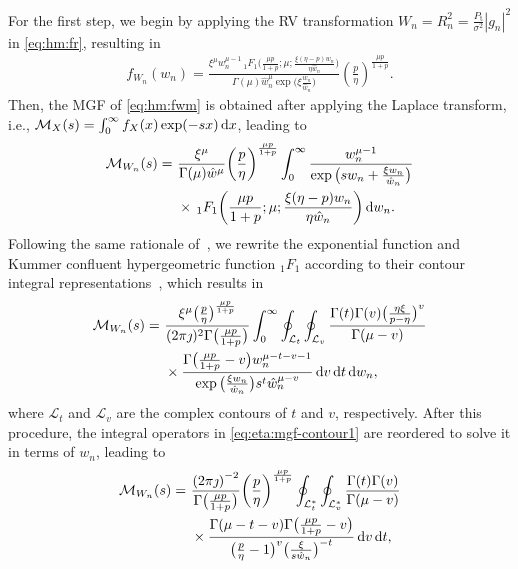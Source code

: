 \documentclass[journal,twocolumn]{IEEEtran}
\begin{document}
For the first step, we begin by applying the \ac{RV} transformation $W_n = R_n^2 = \frac{P_{\textrm{t}}}{\sigma^{2}} |g_{n}|^{2}$ in \eqref{eq:hm:fr}, resulting in
\begin{align} \label{eq:hm:fwm}
   f_{W_n}(w_n) = \frac{\xi^{\mu}w_n^{\mu -1} \, _1F_1 \big(\frac{\mu  p}{1+p};\mu ;\frac{\xi (\eta -p) w_n}{\eta  \hat{w}_n }\big)}{\Gamma (\mu ) \hat{w}_n ^{\mu } \exp \big(\xi\frac{w_n}{ \hat{w}_n }\big)}  \left(\frac{p}{\eta }\right)^{\frac{\mu  p}{1+p}}.
\end{align}
Then, the \ac{MGF} of \eqref{eq:hm:fwm} is obtained after applying the Laplace transform, i.e., $ \mathcal{M}_{X}(s) = \int_0^\infty f_X(x)\exp\left( -s x \right)\diff x$, leading to
\begin{align}
    \mathcal{M}_{W_n}(s) = \ & \frac{\xi^{\mu}}{\Gamma (\mu ) \hat{w}^{\mu}}  \left(\frac{p}{\eta }\right)^{\frac{\mu  p}{1+p}} \int_0^{\infty} \frac{w_n^{\mu -1}}{\exp \big(s w_n+ \frac{\xi w_n}{ \hat{w}_n }\big)} \nonumber \\
    &\times \, _1F_1\left(\frac{\mu  p}{1+p};\mu ;\frac{\xi (\eta -p) w_n}{\eta  \hat{w}_n }\right) \diff w_n. \label{eq:eta:mgf1}
\end{align}
Following the same rationale of~\cite{Alm23a}, we rewrite the exponential function and Kummer confluent hypergeometric function $_1F_1$ according to their contour integral representations~\cite[Eq.~(07.20.07.0003.01), (01.03.07.0001.01)]{WolframResearch}, which results in
\begin{align}
        \mathcal{M}_{W_n}(s) = \ & \frac{\xi^{\mu} \big(\frac{p}{\eta }\big)^{\frac{\mu  p}{1+p}}}{(2 \pi  \jmath)^{2} \Gamma \big(\frac{\mu  p}{1+p}\big)} \int_{0}^{\infty} \oint_{\mathcal{L}_t} \oint_{\mathcal{L}_v} \frac{\Gamma (t) \Gamma (v) \big(\frac{\eta  \xi }{p-\eta }\big)^v}{\Gamma (\mu -v)} \nonumber \\
        & \times \frac{\Gamma \big(\frac{\mu  p}{1+p}-v\big)  w^{\mu -t-v-1}_n}{\exp \big(\frac{\xi w_n}{\hat{w}_n }\big) s^{t} \hat{w}_n ^{\mu -v}} \mathop{}\!\mathrm{d} v \mathop{}\!\mathrm{d} t \mathop{}\!\mathrm{d} w_n, \label{eq:eta:mgf-contour1}
\end{align}
where $\mathcal{L}_t$ and $\mathcal{L}_v$ are the complex contours of $t$ and $v$, respectively. After this procedure, the integral operators in \eqref{eq:eta:mgf-contour1} are reordered to solve it in terms of $w_n$, leading to 
\begin{align}
    \mathcal{M}_{W_n}(s) = \ & \frac{\left(2 \pi \jmath\right)^{-2}}{\Gamma \big(\frac{\mu  p}{1+p}\big)}  \bigg(\frac{p}{\eta }\bigg)^{\frac{\mu  p}{1+p}} \oint_{\mathcal{L}_t^{*}} \oint_{\mathcal{L}_v^{*}} \frac{\Gamma (t) \Gamma (v)}{\Gamma (\mu -v)} \nonumber \\
        &\times \frac{\Gamma (\mu -t-v) \Gamma \big(\frac{\mu p}{1+p}-v\big)}{\big(\frac{p}{\eta }-1\big)^{v} \big(\frac{\xi }{ s \hat{w}_n }\big)^{-t}} \diff v \diff t, \label{eq:eta:mgf-contour2}
\end{align}
\end{document}
